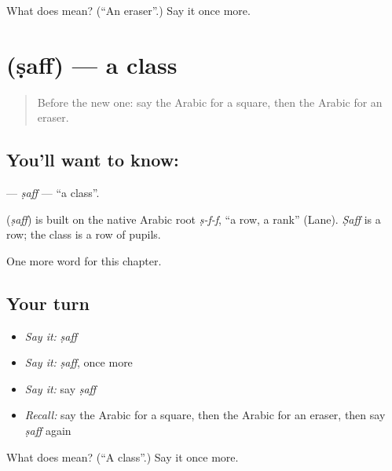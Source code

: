 \begin{tcolorbox}[breakable,colback=teal!4,colframe=teal!35!black,title={Before you move on}]
What does  mean? (\textquotedblleft{}An eraser\textquotedblright{}.) Say it once more.
\end{tcolorbox}
\section[\texorpdfstring{\ar{صف} (ṣaff)}{صف (ṣaff)}]{ (ṣaff) — a class}

\label{lesson:AR-C143-saff}



\begin{quote}
Before the new one: say the Arabic for a square, then the Arabic for an eraser.
\end{quote}

\subsection*{You'll want to know: }
\textbf{} — \emph{ṣaff} — \textquotedblleft{}a class\textquotedblright{}.

\begin{cousinweb}
\textbf{} (\emph{ṣaff}) is built on the native Arabic root \emph{ṣ-f-f}, \textquotedblleft{}a row, a rank\textquotedblright{} (Lane). \emph{Ṣaff} is a row; the class is a row of pupils.
\end{cousinweb}

\begin{grammarlens}[title={What you've built}]
One more word for this chapter.
\end{grammarlens}

\subsection*{Your turn}
\begin{itemize}
\raggedright
  \item \emph{Say it:} \emph{ṣaff}
  \item \emph{Say it:} \emph{ṣaff}, once more
  \item \emph{Say it:} say \emph{ṣaff}
  \item \emph{Recall:} say the Arabic for a square, then the Arabic for an eraser, then say \emph{ṣaff} again
\end{itemize}

\begin{tcolorbox}[breakable,colback=teal!4,colframe=teal!35!black,title={Before you move on}]
What does  mean? (\textquotedblleft{}A class\textquotedblright{}.) Say it once more.
\end{tcolorbox}
